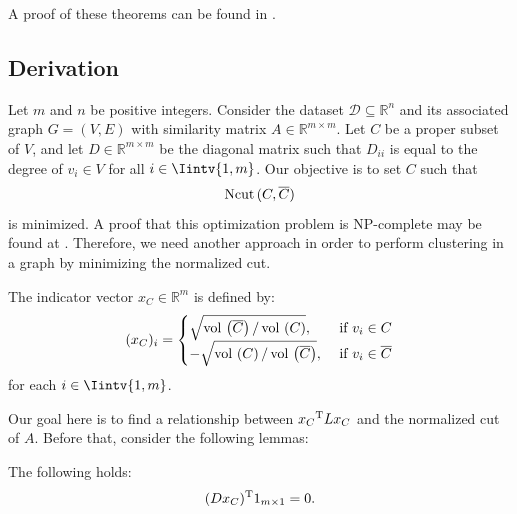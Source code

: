A proof of these theorems can be found in \cite{minmax}.

\subsection{Derivation}

Let $m$ and $n$ be positive integers. 
Consider the dataset $\mathcal D \subseteq \mathbb R ^{n }$ and its associated graph $G = (V,E)$ with similarity matrix $A \in \mathbb R^{m \times m}$.
Let $C$ be a proper subset of $V$, and let $D \in \mathbb R ^{m \times m}$ be the diagonal matrix such that $D_{ii}$ is equal to the degree of $v_i \in V$ for all $i \in \Iintv{1,m}$.
Our objective is to set $C$ such that 
\begin{equation}
   \operatorname*{Ncut\,} (C, \overline C)
\end{equation}
is minimized.
A proof that this optimization problem is NP-complete may be found at \cite{normalized}. 
Therefore, we need another approach in order to perform clustering in a graph by minimizing the normalized cut.

\begin{definition}
The indicator vector $x_C \in \mathbb R ^{m }$ is defined by:
   \begin{equation} \label{indicator}
   (x_C)_i =
   \begin{cases}
      \sqrt{ \operatorname*{vol\,}  \left( \overline C \right) / \operatorname*{vol\,} \left( C \right) }, &\text{ if } v_i \in C \\
      -\sqrt{\operatorname*{vol\,} \left( C \right) / \operatorname*{vol\,} \left( \overline C \right)}, & \text{ if } v_i \in \overline C 
   \end{cases}
\end{equation}
for each $i \in \Iintv{1,m}$.
\end{definition}

Our goal here is to find a relationship between ${x_C}^{\rm T} L x_C$ and the normalized cut of $A$.
Before that, consider the following lemmas:

\begin{lemma} \label{cond1}
   The following holds:
   \begin{equation}
      (D x_C)^{\rm T} 1_{m \times 1} = 0.
   \end{equation}
\end{lemma}

